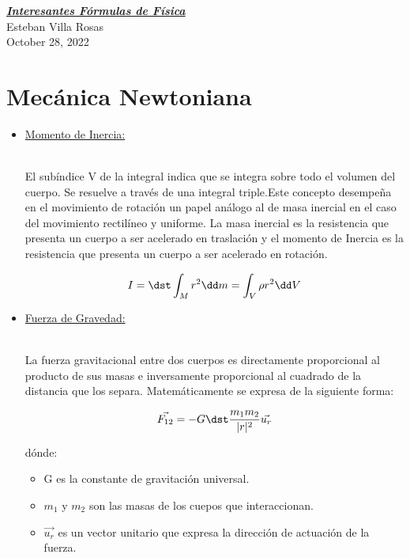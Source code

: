 \documentclass[letterpaper,12pt]{article}
\begin{document}
\begin{center}

{\Huge{{\textbf{\emph{\underline{Interesantes Fórmulas de Física}}}}}}\\

{\small{Esteban Villa Rosas }}\\

{\small{October 28, 2022}}

\end{center}

\section{\Large{Mecánica Newtoniana}} 

\begin{itemize}
    
    \item[\Plane]\large{\underline{Momento de Inercia:}}\\\\ \small{El subíndice V de la integral indica que se integra sobre todo el volumen del cuerpo. Se resuelve a través de una integral triple.Este concepto desempeña en el movimiento de rotación un papel análogo al de masa inercial en el caso del movimiento rectilíneo y uniforme. La masa inercial es la resistencia que presenta un cuerpo a ser acelerado en traslación y el momento de Inercia es la resistencia que presenta un cuerpo a ser acelerado en rotación. 
    
    $$I=\dst \int_M r^2 \dd m=\int_V\rho r^2 \dd V$$
    
    }
    
    \item[\Plane]\large{\underline{Fuerza de Gravedad:}}\\\\
    \small{La fuerza gravitacional entre dos cuerpos es directamente proporcional al producto de sus masas e inversamente proporcional al cuadrado de la distancia que los separa. Matemáticamente se expresa de la siguiente forma:

    \textcolor{red}{$$\vec{F_{12}}=-G\dst\frac{m_1m_2}{|r|^2}\vec{u_r}$$}
  
    dónde:

\begin{itemize}
    \item G es la constante de gravitación universal.
    \item $m_1$ y $m_2$ son las masas de los cuepos que interaccionan.
    \item $\vec{u_r}$ es un vector unitario que expresa la dirección de actuación de la fuerza.


\end{itemize}}
\end{itemize}
\end{document}
